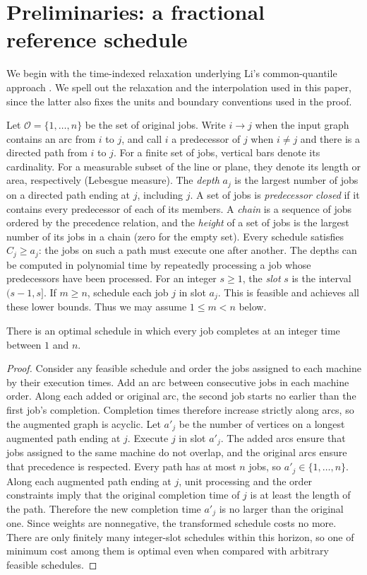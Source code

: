 ﻿\section{Preliminaries: a fractional reference schedule}
\label{sec:foundations-lp}

We begin with the time-indexed relaxation underlying Li's common-quantile
approach \cite[Sections~2.1 and~3]{Li2017}. We spell out the relaxation and the
interpolation used in this paper, since the latter also fixes the units and
boundary conventions used in the proof.

Let $\mathcal O=\{1,\ldots,n\}$ be the set of original jobs.
Write $i\to j$ when the input graph contains an arc from $i$ to $j$, and
call $i$ a predecessor of $j$ when $i\ne j$ and there is a directed path
from $i$ to $j$.
For a finite set of jobs, vertical bars denote its cardinality. For a
measurable subset of the line or plane, they denote its length or area,
respectively (Lebesgue measure). The \emph{depth}
$a_j$ is the largest number of jobs on a directed path ending at $j$,
including $j$. A set of jobs is \emph{predecessor closed} if it contains
every predecessor of each of its members. A \emph{chain} is a sequence of
jobs ordered by the precedence relation, and the \emph{height} of a set
of jobs is the largest number of its jobs in a chain (zero for the empty
set). Every schedule satisfies $C_j\ge a_j$: the jobs on such a
path must execute one after another. The depths can be computed in polynomial
time by repeatedly processing a job whose predecessors have been processed.
For an integer $s\ge1$, the \emph{slot} $s$ is
the interval $(s-1,s]$. If $m\ge n$, schedule each job $j$ in
slot $a_j$. This is feasible and achieves all these lower bounds. Thus we
may assume $1\le m<n$ below.

\begin{lemma}
There is an optimal schedule in which every job completes at an integer
time between $1$ and $n$.
\end{lemma}
\begin{proof}
Consider any feasible schedule and order the jobs assigned to each machine
by their execution times. Add an arc between consecutive jobs in each
machine order. Along each added or original arc, the second job starts no
earlier than the first job's completion. Completion times therefore increase
strictly along arcs, so the augmented graph is acyclic. Let $a'_j$ be the number
of vertices on a longest augmented path ending at $j$. Execute $j$ in slot
$a'_j$. The added arcs ensure that jobs
assigned to the same machine do not overlap, and the original arcs ensure
that precedence is respected. Every path has at most $n$ jobs, so
$a'_j\in\{1,\ldots,n\}$. Along each augmented path ending at $j$, unit
processing and the order constraints imply that the original completion
time of $j$ is at least the length of the path. Therefore the new completion
time $a'_j$ is no larger than the original one. Since weights are
nonnegative, the transformed schedule costs no more. There are only finitely
many integer-slot schedules within this horizon, so one of minimum cost
among them is optimal even when compared with arbitrary feasible schedules.
\end{proof}

